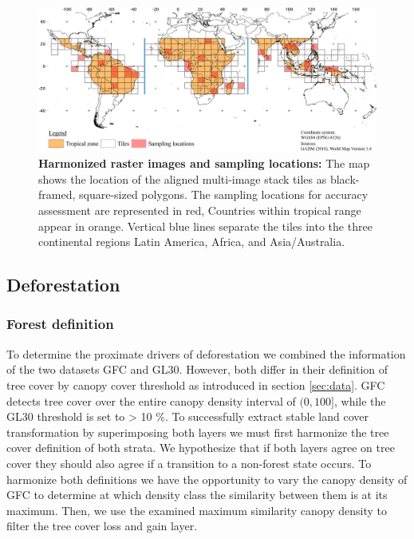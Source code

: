 		\begin{figure}[!ht]
			\centering
			\includegraphics[scale=.96]{img/method_overview_frameless}
			\caption[Harmonized raster images and sampling locations]{\textbf{Harmonized raster images and sampling locations:} The map shows the location of the aligned multi-image stack tiles as black-framed, square-sized polygons. The sampling locations for accuracy assessment are represented in red, Countries within tropical range appear in orange. Vertical blue lines separate the tiles into the three continental regions Latin America, Africa, and Asia/Australia.}
			\label{fig:aligned_tiles}
		\end{figure}

	\subsection{Deforestation} 
		\subsubsection{Forest definition}
			To determine the proximate drivers of deforestation we combined the information of the two datasets \ac{GFC} and \ac{GL30}. However, both differ in their definition of tree cover by canopy cover threshold as introduced in section \ref{sec:data}. \ac{GFC} detects tree cover over the entire canopy density interval of $(0,100]$, while the \ac{GL30} threshold is set to > 10 \%. To successfully extract stable land cover transformation by superimposing both layers we must first harmonize the tree cover definition of both strata. We hypothesize that if both layers agree on tree cover they should also agree if a transition to a non-forest state occurs. To harmonize both definitions we have the opportunity to vary the canopy density of \ac{GFC} to determine at which density class the similarity between them is at its maximum. Then, we use the examined maximum similarity canopy density to filter the tree cover loss and gain layer.

